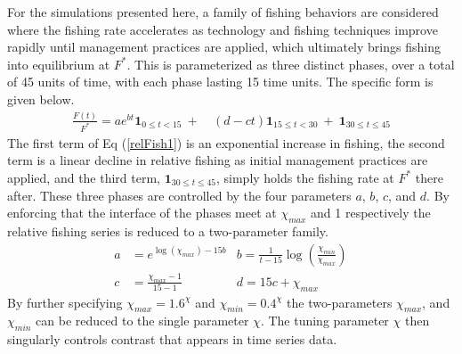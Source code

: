 %
For the simulations presented here, a family of fishing behaviors are
considered where the fishing rate accelerates as technology and fishing
techniques improve rapidly until management practices are applied, which
ultimately brings fishing into equilibrium at $F^*$. %
This is parameterized as three distinct phases, over a total of 45 units of
time, with each phase lasting 15 time units. The specific form is given below. %
\begin{align}
        \frac{F(t)}{F^*} = a e^{b t}\bm{1}_{0\le t<15} ~+~&(d-c t)\bm{1}_{15\le t<30} ~+~ \bm{1}_{30\le t \le 45} \label{relFish1} %
\end{align}
%
The first term of Eq (\ref{relFish1}) is an exponential increase in fishing,
the second term is a linear decline in relative fishing as initial management
practices are applied, and the third term, $\bm{1}_{30\le t \le 45}$, simply
holds the fishing rate at $F^*$ there after. These three phases are
controlled by the four parameters $a$, $b$, $c$, and $d$. By enforcing that
the interface of the phases meet at $\chi_{max}$ and 1 respectively
the relative fishing series is reduced to a two-parameter family. %
%
\begin{align}
        a &= e^{\log(\chi_{max})-15b}   &b = \frac{1}{t-15}\log\left(\frac{\chi_{min}}{\chi_{max}}\right) \label{relFish2} \\ %
        c &= \frac{\chi_{max}-1}{15-1}  &d = 15c + \chi_{max} ~~~~~~~~~~~ \label{relFish3}
\end{align}
%
By further specifying {\color{red}$\chi_{max} = 1.6^\chi$ and $\chi_{min} = 0.4^\chi$}
the two-parameters $\chi_{max}$, and $\chi_{min}$ can be reduced to the single
parameter $\chi$. The tuning parameter $\chi$ then singularly controls contrast
that appears in time series data.


